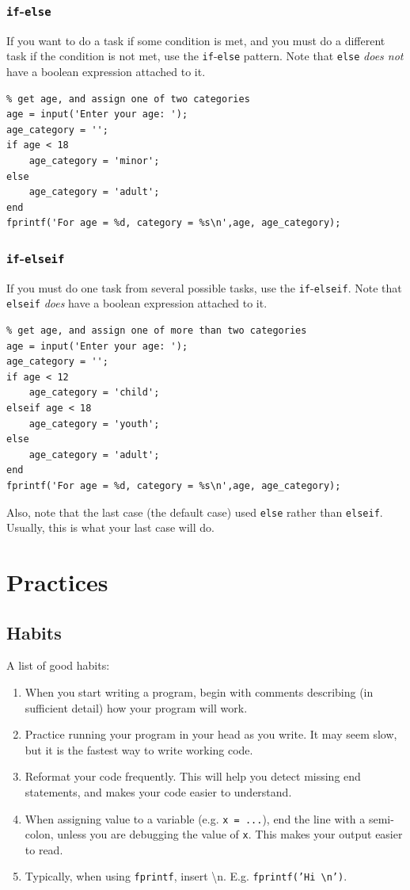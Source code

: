 \documentclass{report}[11pt]
\newcommand{\code}[1]{\texttt{#1}}
\begin{document}
\subsection{\code{if}-\code{else}}
If you want to do a task if some condition is met, and you must do a different task if the condition is not met, use the \code{if}-\code{else} pattern.  Note that \code{else} {\em does not} have a boolean expression attached to it. 
\begin{lstlisting}
% get age, and assign one of two categories
age = input('Enter your age: ');
age_category = '';
if age < 18
    age_category = 'minor';
else
    age_category = 'adult';
end
fprintf('For age = %d, category = %s\n',age, age_category);
\end{lstlisting}

\subsection{\code{if}-\code{elseif}}
If you must do one task from several possible tasks, use the \code{if}-\code{elseif}. Note that \code{elseif} {\em does } have a boolean expression attached to it. 
\begin{lstlisting}
% get age, and assign one of more than two categories
age = input('Enter your age: ');
age_category = '';
if age < 12
    age_category = 'child';
elseif age < 18
    age_category = 'youth';
else 
    age_category = 'adult';
end
fprintf('For age = %d, category = %s\n',age, age_category);
\end{lstlisting}
Also, note that the last case (the default case) used \code{else} rather than \code{elseif}. Usually, this is what your last case will do.

\chapter{Practices}

\section{Habits}
A list of good habits:
\begin{enumerate}
	\item{When you start writing a program, begin with comments describing (in sufficient detail) how your program will work. }
	\item{Practice running your program in your head as you write. It may seem slow, but it is the fastest way to write working code. }
	\item{Reformat your code frequently. This will help you detect missing end statements, and makes your code easier to understand.}
	\item{When assigning value to a variable (e.g. \code{x = ...}), end the line with a semi-colon, unless you are debugging the value of \code{x}. This makes your output easier to read. }
	\item{Typically, when using \code{fprintf}, insert \textbackslash n. E.g. \code{fprintf('Hi  \textbackslash n')}}. 
\end{enumerate}
\end{document}
